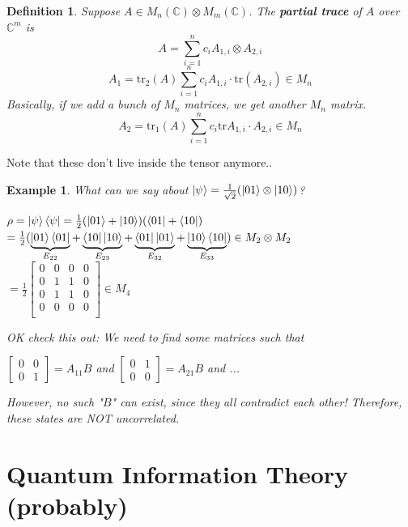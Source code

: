 \documentclass[12pt]{article}
\theoremstyle{plain}
\theoremstyle{nonumberplain}
\theoremstyle{plain}
\newtheorem{definition}[lemma]{Definition}
\newtheorem{example}[lemma]{Example}
\theoremstyle{nonumberplain}
\newcommand\1{{\bf 1}}
\newcommand{\bmat}[1]{\begin{bmatrix*} #1 \end{bmatrix*}} %
\newcommand{\C}{\mathbb{C}} %
\newcommand{\<}{\left\langle}
\renewcommand{\>}{\right\rangle}
\begin{document}
\begin{definition}
Suppose $A\in M_n(\C)\otimes M_m(\C)$. The \textbf{partial trace} of $A$ over $\C^m$ is
\begin{equation}
A=\sum^n_{i=1}c_iA_{1,i}\otimes A_{2,i}
\end{equation}
\begin{equation}
A_1=\text{tr}_2(A)\sum^n_{i=1}c_iA_{1,i}\cdot\text{tr}(A_{2,i})\in M_n
\end{equation}
Basically, if we add a bunch of $M_n$ matrices, we get another $M_n$ matrix.
\begin{equation}
A_2=\text{tr}_1(A)\sum^n_{i=1}c_i\text{tr}A_{1,i}\cdot A_{2,i}\in M_n
\end{equation}
\end{definition}
Note that these don't live inside the tensor anymore..

\begin{example}
What can we say about
$\ket{\psi}=\frac{1}{\sqrt{2}}(\ket{01}\otimes\ket{10})$?\\
\begin{center}
$\rho=\ket{\psi}\bra{\psi}=\frac{1}{2}(\ket{01}+\ket{10})(\bra{01}+\bra{10})$\\
$=\frac{1}{2}(  \underbrace{\textstyle \ket{01}\bra{01}}_{\mathclap{E_{22}}}+\underbrace{\textstyle \bra{10}\ket{10}}_{\mathclap{E_{23}}}+\underbrace{\textstyle \bra{01}\ket{01}}_{\mathclap{E_{32}}}+\underbrace{\textstyle \ket{10}\bra{10}}_{\mathclap{E_{33}}})\in M_2\otimes M_2$\\
$=\frac{1}{2}\bmat{
0 & 0 & 0 & 0 \\
0 & 1 & 1 & 0 \\
0 & 1 & 1 & 0 \\
0 & 0 & 0 & 0 \\
}\in M_4$
\end{center}
OK check this out: We need to find some matrices such that
\begin{center}
$\bmat{0 & 0 \\ 0 & 1}=A_{11}B$ and $\bmat{0 & 1 \\ 0 & 0}=A_{21}B$ and ...
\end{center}
However, no such "$B$" can exist, since they all contradict each other! Therefore, these states are NOT uncorrelated.
\end{example}


\section{Quantum Information Theory (probably)}
\end{document}
